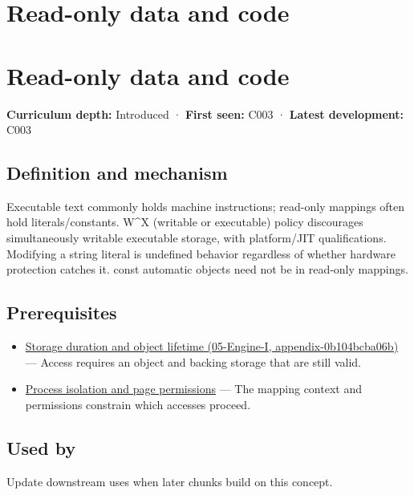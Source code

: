 \hypertarget{appendix-5f9e5e2f0a5e}{}
\section*{Read-only data and code}
\section{Read-only data and code}\label{appendix-5f9e5e2f0a5e-read-only-data-and-code}

\textbf{Curriculum depth:} Introduced · \textbf{First seen:} C003 · \textbf{Latest development:} C003

\subsection{Definition and mechanism}\label{appendix-5f9e5e2f0a5e-definition-and-mechanism}

Executable text commonly holds machine instructions; read-only mappings often hold literals/constants. W\^{}X (writable or executable) policy discourages simultaneously writable executable storage, with platform/JIT qualifications. Modifying a string literal is undefined behavior regardless of whether hardware protection catches it. const automatic objects need not be in read-only mappings.

\subsection{Prerequisites}\label{appendix-5f9e5e2f0a5e-prerequisites}

\begin{itemize}
\tightlist
\item
  \href{../05-Engine-I/main.pdf\#nameddest=appendix-0b104bcba06b}{Storage duration and object lifetime (05-Engine-I, appendix-0b104bcba06b)} --- Access requires an object and backing storage that are still valid.
\item
  \hyperref[appendix-c2a9ad1e2b49]{Process isolation and page permissions} --- The mapping context and permissions constrain which accesses proceed.
\end{itemize}

\subsection{Used by}\label{appendix-5f9e5e2f0a5e-used-by}

Update downstream uses when later chunks build on this concept.

